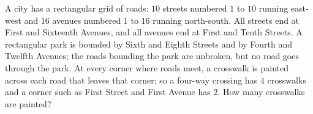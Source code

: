 A city has a rectangular grid of roads: $10$ streets numbered $1$ to $10$ running east-west and $16$ avenues numbered $1$ to $16$ running north-south. All streets end at First and Sixteenth Avenues, and all avenues end at First and Tenth Streets. A rectangular park is bounded by Sixth and Eighth Streets and by Fourth and Twelfth Avenues; the roads bounding the park are unbroken, but no road goes through the park. At every corner where roads meet, a crosswalk is painted across each road that leaves that corner; so a four-way crossing has $4$ crosswalks and a corner such as First Street and First Avenue has $2$. How many crosswalks are painted?
